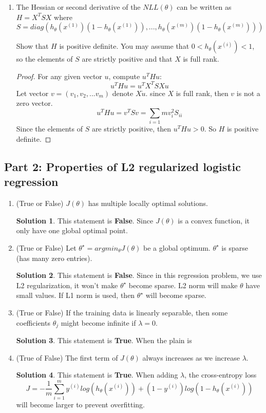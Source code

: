 \documentclass[]{book}
\theoremstyle{definition}
\newtheorem*{soln}{Solution}
\begin{document}
\begin{enumerate}
\begin{proof}
	\end{proof}
	
	\item 
	The Hessian or second derivative of the $NLL(\theta)$ can be written as $H=X^{T}SX$ where
	$$S=diag(h_{\theta}(x^{(1)})(1-h_{\theta}(x^{(1)})),...,h_{\theta}(x^{(m)})(1-h_{\theta}(x^{(m)})))$$
	
	Show that $H$ is positive definite. You may assume that $0 < h_{\theta}(x^{(i)}) < 1$, so the elements of $S$ are strictly positive and that $X$ is full rank.
	
	\begin{proof}
		For any given vector $u$, compute $u^THu$:
		$$u^THu = u^TX^TSXu $$
		Let vector $v = (v_1, v_2,...v_m)$ denote $X\dot u$. since $X$ is full rank, then $v$ is not a zero vector.
		$$u^THu = v^TSv = \sum_{i=1}{m} v_i^2S_{ii}$$
		Since the elements of $S$ are strictly positive, then $u^THu > 0$. So $H$ is positive definite.
	\end{proof}
	
\end{enumerate}

\subsection*{Part 2: Properties of L2 regularized logistic regression }
\begin{enumerate}
	\item (True or False) $J(\theta)$ has multiple locally optimal solutions.
	\begin{soln}
		This statement is \textbf{False}. Since $J(\theta)$ is a convex function, it only have one global optimal point.
	\end{soln}
	
	\item (True or False) Let $\theta^{\star} = argmin_{\theta}J(\theta)$ be a global optimum. $\theta^{\star}$ is sparse (has many zero entries).
	\begin{soln}
		This statement is \textbf{False}. Since in this regression problem, we use L2 regularization, it won't make $\theta^{\star}$ become sparse. L2 norm will make $\theta$ have small values. If L1 norm is used, then $\theta^{\star}$ will become sparse.
	\end{soln}
	
	\item (True or False) If the training data is linearly separable, then some coefficients $\theta_j$ might become infinite if $\lambda = 0$.
	\begin{soln}
		This statement is \textbf{True}. When the plain is
	\end{soln}
	
	\item (True of False) The first term of $J(\theta)$ always increases as we increase $\lambda$.
	\begin{soln}
		This statement is \textbf{True}. When adding $\lambda$, the cross-entropy loss
		$$J = - \frac{1}{m} \sum_{i = 1}^{m} y^{(i)} log(h_{\theta}(x^{(i)})) + (1-y^{(i)})log(1-h_{\theta}(x^{(i)}))$$
		will become larger to prevent overfitting.
	\end{soln}
	
\end{enumerate}
\end{document}
